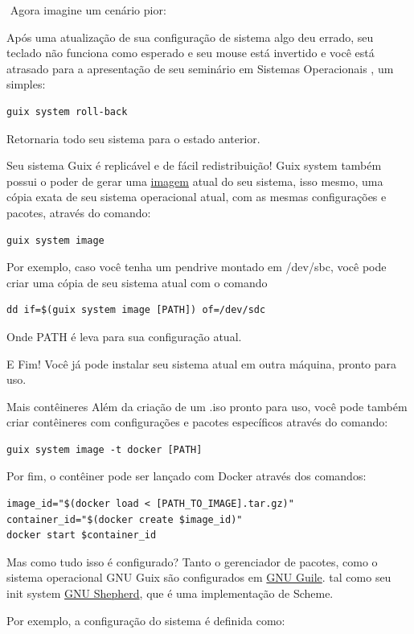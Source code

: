 \documentclass[bigger]{beamer}
\begin{document}
\begin{frame}[label={sec:org3593bd6},fragile]{⁤}
 Agora imagine um cenário pior:

Após uma atualização de sua configuração de sistema algo deu errado,
seu teclado não funciona como esperado e seu mouse está invertido e você está atrasado para a apresentação de
seu seminário em Sistemas Operacionais , um simples:
\begin{verbatim}
guix system roll-back
\end{verbatim}
Retornaria todo seu sistema para o estado anterior.
\end{frame}
\begin{frame}[label={sec:orgc64d17f},fragile]{Seu sistema Guix é replicável e de fácil redistribuição!}
 Guix system também possui o poder de gerar uma \href{https://guix.gnu.org/manual/en/html\_node/Invoking-guix-system.html\#index-image\_002c-creating-disk-images}{imagem} atual do seu sistema, isso mesmo, uma cópia exata de
seu sistema operacional atual, com as mesmas configurações e pacotes, através do comando:
\begin{verbatim}
guix system image
\end{verbatim}
Por exemplo, caso você tenha um pendrive montado em /dev/sbc, você pode criar uma cópia de seu sistema atual
com o comando
\begin{verbatim}
dd if=$(guix system image [PATH]) of=/dev/sdc
\end{verbatim}
Onde PATH é leva para sua configuração atual.

E Fim! Você já pode instalar seu sistema atual em outra máquina, pronto para uso.
\end{frame}
\begin{frame}[label={sec:orga063d3c},fragile]{Mais contêineres}
 Além da criação de um .iso pronto para uso, você pode também criar contêineres com configurações e pacotes
específicos através do comando:
\begin{verbatim}
guix system image -t docker [PATH]
\end{verbatim}

Por fim, o contêiner pode ser lançado com Docker através dos comandos:
\begin{verbatim}
image_id="$(docker load < [PATH_TO_IMAGE].tar.gz)"
container_id="$(docker create $image_id)"
docker start $container_id
\end{verbatim}
\end{frame}
\begin{frame}[label={sec:orgda3a970}]{Mas como tudo isso é configurado?}
Tanto o gerenciador de pacotes, como o sistema operacional GNU Guix são configurados em \href{https://www.gnu.org/software/guile/}{GNU Guile}. tal como
seu init system \href{https://www.gnu.org/software/shepherd/}{GNU Shepherd}, que é uma implementação de Scheme.

Por exemplo, a configuração do sistema é definida como:
\end{frame}
\end{document}

